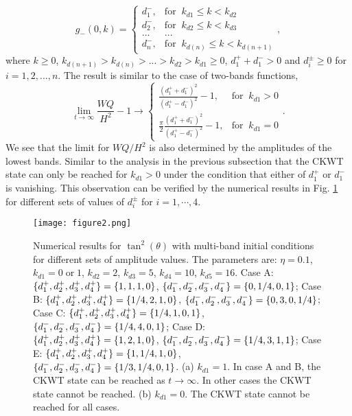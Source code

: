 \documentclass[english,aps,superscriptaddress,preprint]{revtex4-1}
\begin{document}
\begin{equation}
g_{-}\left(0,k\right)=\begin{cases}
d_{1}^{-}, & \mathrm{for}\;\;k_{d1}\leq k<k_{d2}\\
d_{2}^{-}, & \mathrm{for}\;\;k_{d2}\leq k<k_{d3}\\
... & ...\\
d_{n}^{-}, & \mathrm{for}\;\;k_{d(n)}\leq k<k_{d(n+1)}
\end{cases},
\end{equation}
where $k\geq0$, $k_{d(n+1)}>k_{d(n)}>...>k_{d2}>k_{d1}\geq0$, $d_{1}^{+}+d_{1}^{-}>0$
and $d_{i}^{\pm}\geq0$ for $i=1,2,...,n$. The result is similar
to the case of two-bands functions, 
\begin{equation}
\lim_{t\rightarrow\infty}\frac{WQ}{H^{2}}-1\rightarrow\begin{cases}
\frac{\left(d_{1}^{+}+d_{1}^{-}\right)^{2}}{\left(d_{1}^{+}-d_{1}^{-}\right)^{2}}-1, & \mathrm{for}\;\;k_{d1}>0\\
\frac{\pi}{2}\frac{\left(d_{1}^{+}+d_{1}^{-}\right)^{2}}{\left(d_{1}^{+}-d_{1}^{-}\right)^{2}}-1, & \mathrm{for}\;\;k_{d1}=0
\end{cases}.\label{eq:limit-multi-steps}
\end{equation}
We see that the limit for $WQ/H^{2}$ is also determined by the amplitudes
of the lowest bands. Similar to the analysis in the previous subsection
that the CKWT state can only be reached for $k_{d1}>0$ under the
condition that either of $d_{1}^{+}$ or $d_{1}^{-}$ is vanishing.
This observation can be verified by the numerical results in Fig.
\ref{fig:WQ-H-multi-band} for different sets of values of $d_{i}^{\pm}$
for $i=1,\cdots,4$.

\begin{figure}[h]
\caption{\label{fig:WQ-H-multi-band}Numerical results for $\tan^{2}(\theta)$
with multi-band initial conditions for different sets of amplitude
values. The parameters are: $\eta=0.1$, $k_{d1}=0\;\mathrm{or}\;1$,
$k_{d2}=2$, $k_{d3}=5$, $k_{d4}=10$, $k_{d5}=16$. Case A: $\{d_{1}^{+},\text{\ensuremath{d_{2}^{+}}},d_{3}^{+},d_{4}^{+}\}=\{1,1,1,0\}$,
$\{d_{1}^{-},\text{\ensuremath{d_{2}^{-}}},d_{3}^{-},d_{4}^{-}\}=\{0,1/4,0,1\}$;
Case B: $\{d_{1}^{+},\text{\ensuremath{d_{2}^{+}}},d_{3}^{+},d_{4}^{+}\}=\{1/4,2,1,0\}$,
$\{d_{1}^{-},\text{\ensuremath{d_{2}^{-}}},d_{3}^{-},d_{4}^{-}\}=\{0,3,0,1/4\}$;
Case C: $\{d_{1}^{+},\text{\ensuremath{d_{2}^{+}}},d_{3}^{+},d_{4}^{+}\}=\{1/4,1,0,1\}$,
$\{d_{1}^{-},\text{\ensuremath{d_{2}^{-}}},d_{3}^{-},d_{4}^{-}\}=\{1/4,4,0,1\}$;
Case D: $\{d_{1}^{+},\text{\ensuremath{d_{2}^{+}}},d_{3}^{+},d_{4}^{+}\}=\{1,2,1,0\}$,
$\{d_{1}^{-},\text{\ensuremath{d_{2}^{-}}},d_{3}^{-},d_{4}^{-}\}=\{1/4,3,1,1\}$;
Case E: $\{d_{1}^{+},\text{\ensuremath{d_{2}^{+}}},d_{3}^{+},d_{4}^{+}\}=\{1,1/4,1,0\}$,
$\{d_{1}^{-},\text{\ensuremath{d_{2}^{-}}},d_{3}^{-},d_{4}^{-}\}=\{1/3,1/4,0,1\}$.
(a) $k_{d1}=1$. In case A and B, the CKWT state can be reached as
$t\rightarrow\infty$. In other cases the CKWT state cannot be reached.
(b) $k_{d1}=0$. The CKWT state cannot be reached for all cases.}

\centering{}\texttt{[image: figure2.png]}
\end{figure}
\end{document}
